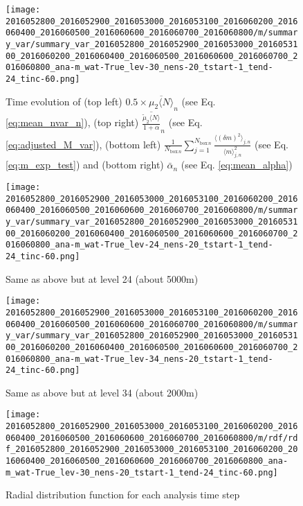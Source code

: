\documentclass[a4paper, 12pt]{article}
\begin{document}
\begin{figure}[ht] \label{fig:summary_var}
\noindent \centering
\texttt{[image: 2016052800\_2016052900\_2016053000\_2016053100\_2016060200\_2016060400\_2016060500\_2016060600\_2016060700\_2016060800/m/summary\_var/summary\_var\_2016052800\_2016052900\_2016053000\_2016053100\_2016060200\_2016060400\_2016060500\_2016060600\_2016060700\_2016060800\_ana-m\_wat-True\_lev-30\_nens-20\_tstart-1\_tend-24\_tinc-60.png]}\\
\caption{Time evolution of (top left) $0.5 \times \overline{\mu_{2}\langle N \rangle}_n$ (see Eq. \ref{eq:mean_nvar_n}), (top right) $\overline{\frac{\tilde{\mu}_2 \langle N \rangle}{1+\alpha}}_n$ (see Eq. \ref{eq:adjusted_M_var}), (bottom left) $\frac{1}{N_{\mathrm{box}\,n}} \sum_{j=1}^{N_{\mathrm{box}\,n}} \frac{\langle (\delta m)^2 \rangle_{j,n}}{\langle m \rangle_{j,n}^2}$ (see Eq. \ref{eq:m_exp_test}) and (bottom right) $\bar{\alpha}_n$ (see Eq. \ref{eq:mean_alpha})}
\end{figure}
\begin{figure}[ht]
\noindent \centering
\texttt{[image: 2016052800\_2016052900\_2016053000\_2016053100\_2016060200\_2016060400\_2016060500\_2016060600\_2016060700\_2016060800/m/summary\_var/summary\_var\_2016052800\_2016052900\_2016053000\_2016053100\_2016060200\_2016060400\_2016060500\_2016060600\_2016060700\_2016060800\_ana-m\_wat-True\_lev-24\_nens-20\_tstart-1\_tend-24\_tinc-60.png]}\\
\caption{Same as above but at level 24 (about 5000m)}
\end{figure}
\begin{figure}[ht]
\noindent \centering
\texttt{[image: 2016052800\_2016052900\_2016053000\_2016053100\_2016060200\_2016060400\_2016060500\_2016060600\_2016060700\_2016060800/m/summary\_var/summary\_var\_2016052800\_2016052900\_2016053000\_2016053100\_2016060200\_2016060400\_2016060500\_2016060600\_2016060700\_2016060800\_ana-m\_wat-True\_lev-34\_nens-20\_tstart-1\_tend-24\_tinc-60.png]}\\
\caption{Same as above but at level 34 (about 2000m)}
\end{figure}


\begin{figure}[ht] \label{fig:rdf}
\noindent \centering
\texttt{[image: 2016052800\_2016052900\_2016053000\_2016053100\_2016060200\_2016060400\_2016060500\_2016060600\_2016060700\_2016060800/m/rdf/rdf\_2016052800\_2016052900\_2016053000\_2016053100\_2016060200\_2016060400\_2016060500\_2016060600\_2016060700\_2016060800\_ana-m\_wat-True\_lev-30\_nens-20\_tstart-1\_tend-24\_tinc-60.png]}\\
\caption{Radial distribution function for each analysis time step}
\end{figure}
\clearpage
\newpage
\end{document}
